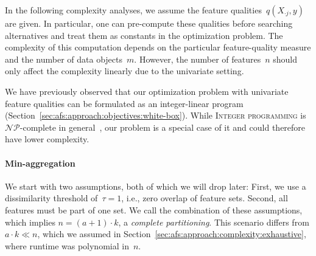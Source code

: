 \documentclass[iicol, sn-basic, Numbered]{sn-jnl} %
\theoremstyle{plain}
\theoremstyle{definition}
\begin{document}
In the following complexity analyses, we assume the feature qualities~$q(X_{\cdot{}j},y)$ are given.
In particular, one can pre-compute these qualities before searching alternatives and treat them as constants in the optimization problem.
The complexity of this computation depends on the particular feature-quality measure and the number of data objects~$m$.
However, the number of features~$n$ should only affect the complexity linearly due to the univariate setting.

We have previously observed that our optimization problem with univariate feature qualities can be formulated as an integer-linear program (Section~\ref{sec:afs:approach:objectives:white-box}).
While \textsc{Integer programming} is $\mathcal{NP}$-complete in general~\cite{garey2003computers, karp1972reducibility}, our problem is a special case of it and could therefore have lower complexity. 

\paragraph{Min-aggregation}

We start with two assumptions, both of which we will drop later:
First, we use a dissimilarity threshold of~$\tau = 1$, i.e., zero overlap of feature sets.
Second, all features must be part of one set.
We call the combination of these assumptions, which implies $n = (a+1) \cdot k$, a \emph{complete partitioning}.
This scenario differs from $a \cdot k \ll n$, which we assumed in Section~\ref{sec:afs:approach:complexity:exhaustive}, where runtime was polynomial in~$n$.
\end{document}
